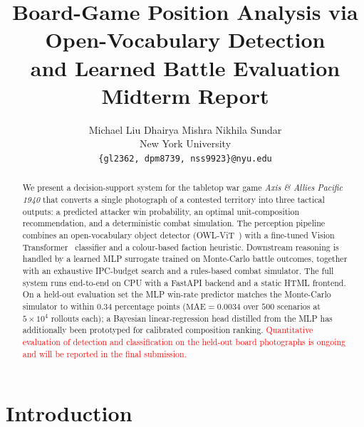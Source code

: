 \documentclass[10pt,twocolumn,letterpaper]{article}
\newcommand{\red}[1]{\textcolor{red}{#1}}
\begin{document}
\title{%
  Board-Game Position Analysis via Open-Vocabulary Detection\\
  and Learned Battle Evaluation\\[4pt]
  {\large Midterm Report}
}

\author{%
  Michael Liu \quad Dhairya Mishra \quad Nikhila Sundar\\
  New York University\\
  \texttt{\{gl2362, dpm8739, nss9923\}@nyu.edu}
}

\maketitle

\begin{abstract}
We present a decision-support system for the tabletop war game
\emph{Axis \& Allies Pacific 1940} that converts a single photograph
of a contested territory into three tactical outputs: a predicted attacker
win probability, an optimal unit-composition recommendation, and a
deterministic combat simulation.
The perception pipeline combines an open-vocabulary object detector
(\mbox{OWL-ViT}~\cite{owlvit}) with a fine-tuned Vision
Transformer~\cite{vit} classifier and a colour-based faction heuristic.
Downstream reasoning is handled by a learned MLP surrogate trained on
Monte-Carlo battle outcomes, together with an exhaustive IPC-budget search
and a rules-based combat simulator.
The full system runs end-to-end on CPU with a \mbox{FastAPI} backend
and a static HTML frontend.
On a held-out evaluation set the MLP win-rate predictor matches the
Monte-Carlo simulator to within $0.34$ percentage points
($\mathrm{MAE}\!=\!0.0034$ over $500$ scenarios at $5\!\times\!10^{4}$
rollouts each); a Bayesian linear-regression head distilled from the
MLP has additionally been prototyped for calibrated composition
ranking.
\red{Quantitative evaluation of detection and classification on the
held-out board photographs is ongoing and will be reported in the
final submission.}
\end{abstract}

\section{Introduction}
\label{sec:intro}
\end{document}
